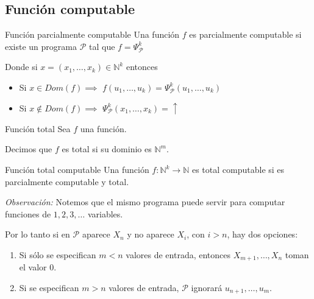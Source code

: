 \subsection{Función computable}

\begin{definicion}{Función parcialmente computable}{}
    Una función $f$ es parcialmente computable si existe un programa 
    $\mathcal{P}$ tal que $f = \Psi_{\mathcal{P}}^k$

    \medskip

    Donde si $x = (x_1, \dotsc, x_k) \in \mathbb{N}^k$ entonces
    \begin{itemize}
        \item Si $x \in Dom(f) \implies$
            $f(u_1, \dotsc, u_k) = \Psi_{\mathcal{P}}^k (u_1, \dotsc, u_k)$
    \item Si $x \notin Dom(f) \implies$
            $\Psi_{\mathcal{P}}^k (x_1, \dotsc, x_k) = \uparrow$
    \end{itemize}
\end{definicion}

\medskip

\begin{definicion}{Función total}{}
    Sea $f$ una función.

    \medskip

    Decimos que $f$ es total si su dominio es $\mathbb{N}^m$.
\end{definicion}

\medskip

\begin{definicion}{Función total computable}{}
    Una función $f: \mathbb{N}^k \to \mathbb{N}$ es total computable si es 
    parcialmente computable y total.
\end{definicion}

\bigskip
\textit{Observación:}
Notemos que el mismo programa puede servir para computar funciones de
$1, 2, 3, \dotsc$ variables.

Por lo tanto si en $\mathcal{P}$ aparece $X_n$ y no aparece $X_i$, con $i>n$,
hay dos opciones:
\begin{enumerate}
    \item Si sólo se especifican $m < n$ valores de entrada, entonces 
        $X_{m+1}, \dotsc, X_n$ toman el valor 0.
    \item Si se especifican $m>n$ valores de entrada, $\mathcal{P}$ ignorará
        $u_{n+1}, \dotsc, u_m$.
\end{enumerate}

